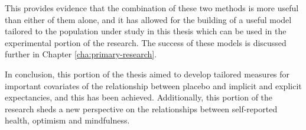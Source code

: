 \documentclass{article}
\begin{document}
This provides evidence that the combination of these two methods is more useful than either of them alone, and it has allowed for the building of a useful model tailored to the population under study in this thesis which can be used in the experimental portion of the research. The success of these models is discussed further in Chapter \ref{cha:primary-research}.



In conclusion, this portion of the thesis aimed to develop tailored measures for important covariates of the relationship between placebo and implicit and explicit expectancies, and this has been achieved. Additionally, this portion of the research sheds a new perspective on the relationships between self-reported health, optimism and mindfulness. 














\end{document}
